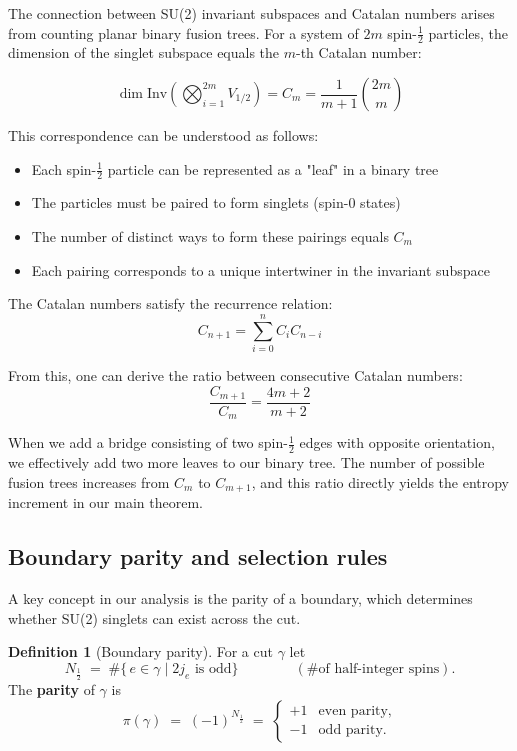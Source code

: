 \documentclass[11pt, a4paper]{article}
\theoremstyle{plain}
\theoremstyle{definition}
\newtheorem{definition}[theorem]{Definition}
\theoremstyle{remark}
\newcommand{\Inv}{\mathrm{Inv}}
\begin{document}
The connection between SU(2) invariant subspaces and Catalan numbers arises from counting planar binary fusion trees. For a system of $2m$ spin-$\frac{1}{2}$ particles, the dimension of the singlet subspace equals the $m$-th Catalan number:

\begin{equation}
  \dim\Inv\left(\bigotimes_{i=1}^{2m} V_{1/2}\right) = C_m = \frac{1}{m+1}\binom{2m}{m}
\end{equation}

This correspondence can be understood as follows:
\begin{itemize}
  \item Each spin-$\frac{1}{2}$ particle can be represented as a "leaf" in a binary tree
  \item The particles must be paired to form singlets (spin-0 states)
  \item The number of distinct ways to form these pairings equals $C_m$
  \item Each pairing corresponds to a unique intertwiner in the invariant subspace
\end{itemize}

The Catalan numbers satisfy the recurrence relation:
\begin{equation}
  C_{n+1} = \sum_{i=0}^{n} C_i C_{n-i}
\end{equation}

From this, one can derive the ratio between consecutive Catalan numbers:
\begin{equation}
  \frac{C_{m+1}}{C_m} = \frac{4m+2}{m+2}
\end{equation}

When we add a bridge consisting of two spin-$\frac{1}{2}$ edges with opposite orientation, we effectively add two more leaves to our binary tree. The number of possible fusion trees increases from $C_m$ to $C_{m+1}$, and this ratio directly yields the entropy increment in our main theorem.

\subsection{Boundary parity and selection rules}
\label{sec:parity}

A key concept in our analysis is the parity of a boundary, which determines whether SU(2) singlets can exist across the cut.

\begin{definition}[Boundary parity]
  \label{def:parity}
  For a cut $\gamma$ let
  \[  N_{\tfrac12} \;=\;\#\{\,e\in\gamma \mid 2j_e\text{ is odd}\}\qquad\qquad(\text{\# of half-integer spins}) .\]
  The \textbf{parity} of $\gamma$ is
  \[  \pi(\gamma)\;=\;(-1)^{N_{\tfrac12}}  \;=\;
    \begin{cases}     +1 &\text{even parity,}\\     -1 &\text{odd parity.}
  \end{cases}\]
\end{definition}
\end{document}
